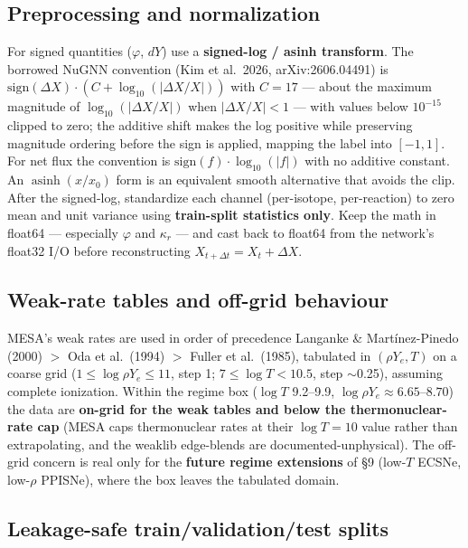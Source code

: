 \documentclass[11pt]{article}
\begin{document}
\subsection{Preprocessing and normalization}

For signed quantities ($\varphi$, $dY$) use a \textbf{signed-log / asinh transform}. The borrowed NuGNN convention (Kim et al.\ 2026, arXiv:2606.04491) is $\mathrm{sign}(\Delta X)\cdot(C + \log_{10}(|\Delta X / X|))$ with $C = 17$ --- about the maximum magnitude of $\log_{10}(|\Delta X / X|)$ when $|\Delta X / X| < 1$ --- with values below $10^{-15}$ clipped to zero; the additive shift makes the log positive while preserving magnitude ordering before the sign is applied, mapping the label into $[-1, 1]$. For net flux the convention is $\mathrm{sign}(f)\cdot\log_{10}(|f|)$ with no additive constant. An $\operatorname{asinh}(x/x_0)$ form is an equivalent smooth alternative that avoids the clip. After the signed-log, standardize each channel (per-isotope, per-reaction) to zero mean and unit variance using \textbf{train-split statistics only}. Keep the math in float64 --- especially $\varphi$ and $\kappa_r$ --- and cast back to float64 from the network's float32 I/O before reconstructing $X_{t+\Delta t} = X_t + \Delta X$.

\subsection{Weak-rate tables and off-grid behaviour}

MESA's weak rates are used in order of precedence Langanke \& Mart\'inez-Pinedo (2000) $>$ Oda et al.\ (1994) $>$ Fuller et al.\ (1985), tabulated in $(\rho Y_e, T)$ on a coarse grid ($1 \le \log \rho Y_e \le 11$, step 1; $7 \le \log T < 10.5$, step $\sim$0.25), assuming complete ionization. Within the regime box ($\log T$ 9.2--9.9, $\log \rho Y_e \approx 6.65$--$8.70$) the data are \textbf{on-grid for the weak tables and below the thermonuclear-rate cap} (MESA caps thermonuclear rates at their $\log T = 10$ value rather than extrapolating, and the weaklib edge-blends are documented-unphysical). The off-grid concern is real only for the \textbf{future regime extensions} of \S9 (low-$T$ ECSNe, low-$\rho$ PPISNe), where the box leaves the tabulated domain.

\subsection{Leakage-safe train/validation/test splits}
\end{document}
